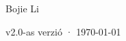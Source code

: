 \begin{titlepage}
\vfill
{\LARGE\sffamily Bojie Li\par}
\vspace{0.7cm}
{\small\sffamily\color{structurecolor!80} v2.0-as verzió · \today\par}
\vspace{1.2cm}
\end{titlepage}
